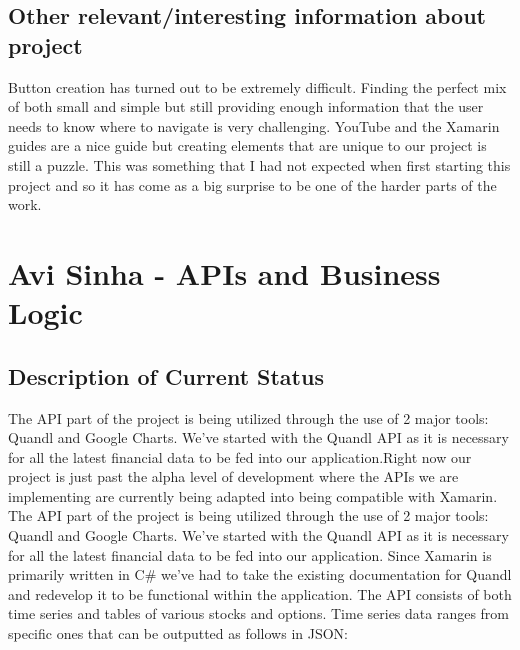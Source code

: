 \documentclass[letterpaper,10pt,titlepage,journal,compsoc,draftclsnofoot,onecolumn]{IEEEtran}
\begin{document}
\subsection{Other relevant/interesting information about project}

Button creation has turned out to be extremely difficult. Finding the perfect mix of both small and simple but still providing enough information that the user needs to know where to navigate is very challenging. YouTube and the Xamarin guides are a nice guide but creating elements that are unique to our project is still a puzzle. This was something that I had not expected when first starting this project and so it has come as a big surprise to be one of the harder parts of the work.

\section{Avi Sinha - APIs and Business Logic}

\subsection{Description of Current Status}
The API part of the project is being utilized through the use of 2 major tools: Quandl and Google Charts. We've started with the Quandl API as it is necessary for all the latest financial data to be fed into our application.Right now our project is just past the alpha level of development where the APIs we are implementing are currently being adapted into being compatible with Xamarin. 
The API part of the project is being utilized through the use of 2 major tools: Quandl and Google Charts. We've started with the Quandl API as it is necessary for all the latest financial data to be fed into our application. Since Xamarin is primarily written in C\# we've had to take the existing documentation for Quandl and redevelop it to be functional within the application. The API consists of both time series and tables of various stocks and options. Time series data ranges from specific ones that can be outputted as follows in JSON: 
\end{document}
